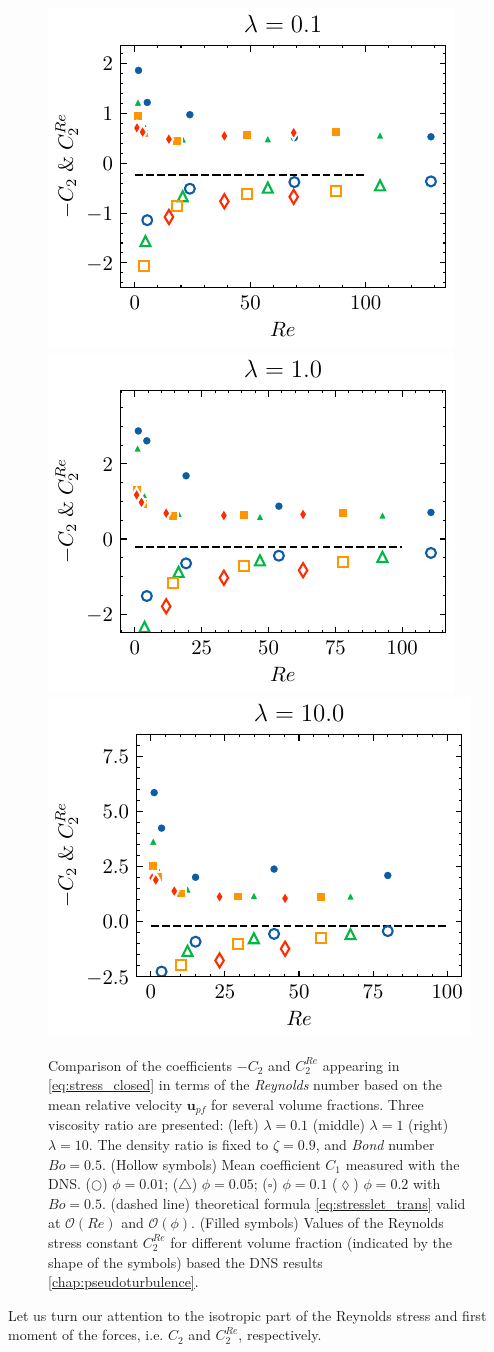 \begin{figure}[h!]
    \centering
    \includegraphics[height = 0.25\textwidth]{image/HOMOGENEOUS_final/PA/Str_l_1.pdf}
    \includegraphics[height = 0.25\textwidth]{image/HOMOGENEOUS_final/PA/Str_l_10.pdf}
    \includegraphics[height = 0.25\textwidth]{image/HOMOGENEOUS_final/PA/Str_l_100.pdf}
    \caption{
        Comparison of the coefficients $-C_2$ and $C_2^{Re}$ appearing in \ref{eq:stress_closed} in terms of the \textit{Reynolds} number based on the mean relative velocity $\textbf{u}_{pf}$ for several volume fractions.
        Three viscosity ratio are presented: (left) $\lambda = 0.1$ (middle) $\lambda = 1$ (right) $\lambda = 10$. 
        The density ratio is fixed to $\zeta = 0.9$, and \textit{Bond} number $Bo =0.5$. 
        (Hollow symbols) Mean coefficient $C_1$ measured with the DNS. 
        ($\pmb\bigcirc$) $\phi = 0.01$; ($\pmb\triangle$) $ \phi = 0.05$; ($\pmb\square$) $\phi = 0.1$ ($\pmb\lozenge$) $\phi = 0.2$ with $Bo = 0.5$.
        (dashed line) theoretical formula \ref{eq:stresslet_trans} valid at $\mathcal{O}(Re)$ and $\mathcal{O}(\phi)$. 
        (Filled symbols) Values of the Reynolds stress constant $C_2^{Re}$ for different volume fraction (indicated by the shape of the symbols) based the DNS results \eqref{chap:pseudoturbulence}. 
     }
     \label{fig:Str_DNS}
\end{figure}
Let us turn our attention to the isotropic part of the Reynolds stress and first moment of the forces, i.e. $C_2$ and $C_2^{Re}$, respectively. 
